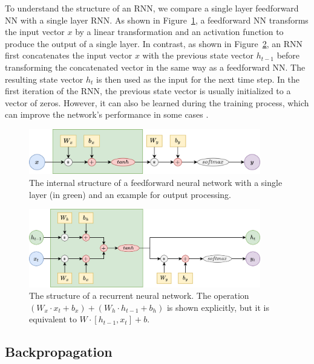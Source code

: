 \documentclass{article}
\newcommand{\reffig}[1]{Figure~\ref{#1}}
\begin{document}
To understand the structure of an RNN, we compare a single layer feedforward NN with a
single layer RNN. As shown in \reffig{fig:internal-feedforward}, a feedforward NN
transforms the input vector $x$ by a linear transformation and an activation function to
produce the output of a single layer. In contrast, as shown in \reffig{fig:internal-rnn},
an RNN first concatenates the input vector $x$ with the previous state vector $h_{t-1}$
before transforming the concatenated vector in the same way as a feedforward NN. The
resulting state vector $h_t$ is then used as the input for the next time step. In the
first iteration of the RNN, the previous state vector is usually initialized to a vector
of zeros. However, it can also be learned during the training process, which can improve
the network's performance in some cases
\cite{sutskeverImportanceInitializationMomentum2013}.

\begin{figure}[htbp]
  \centering
  \includegraphics[width=0.9\textwidth]{Block Diagram Feedforward.drawio.png}
  \caption{The internal structure of a feedforward neural network with a single layer (in
    green) and an example for output processing.}
  \label{fig:internal-feedforward}
\end{figure}

\begin{figure}[htbp]
  \centering
  \includegraphics[width=0.9\textwidth]{Block Diagram RNN.drawio.png}
  \caption{The structure of a recurrent neural network. The operation $(W_x \cdot x_t +
      b_x) + (W_h \cdot h_{t-1} + b_h)$ is shown explicitly, but it is equivalent to $W
      \cdot [h_{t-1}, x_t] + b$.}
  \label{fig:internal-rnn}
\end{figure}


\subsection{Backpropagation}
\label{sec:2.2}
\end{document}
